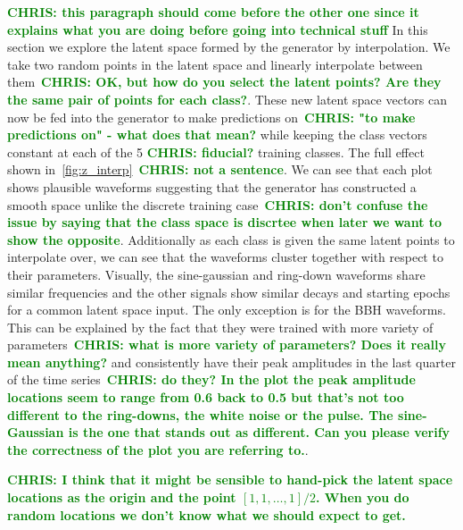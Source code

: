 \documentclass[12pt]{iopart}
\newcommand{\chris}[1]{\textbf{\textcolor{green}{CHRIS: #1}}}
\begin{document}
\chris{this paragraph should come before the other one since it explains what
you are doing before going into technical stuff} In this section we explore the
latent space formed by the generator by interpolation. We take two random
points in the latent space and linearly interpolate between them~\chris{OK, but
how do you select the latent points? Are they the same pair of points for each
class?}. These new latent space vectors can now be fed into the generator to
make predictions on~\chris{"to make predictions on" - what does that mean?}
while keeping the class vectors constant at each of the 5 \chris{fiducial?}
training classes. The full effect shown in~\cref{fig:z_interp}~\chris{not a
sentence}. We can see that each plot shows plausible waveforms suggesting that
the generator has constructed a smooth space unlike the discrete training
case~\chris{don't confuse the issue by saying that the class space is discrtee
when later we want to show the opposite}. Additionally as each class is given
the same latent points to interpolate over, we can see that the waveforms
cluster together with respect to their parameters. Visually, the sine-gaussian
and ring-down waveforms share similar frequencies and the other signals show
similar decays and starting epochs for a common latent space input. The only
exception is for the \ac{BBH} waveforms. This can be explained by the fact that
they were trained with more variety of parameters~\chris{what is more variety
of parameters? Does it really mean anything?} and consistently have their peak
amplitudes in the last quarter of the time series~\chris{do they? In the plot
the peak amplitude locations seem to range from 0.6 back to 0.5 but that's not
too different to the ring-downs, the white noise or the pulse. The
sine-Gaussian is the one that stands out as different. Can you please verify
the correctness of the plot you are referring to.}.

\chris{I think that it might be sensible to hand-pick the latent space
locations as the origin and the point $[1,1,\ldots,1]/2$. When you do random
locations we don't know what we should expect to get.}
\end{document}
